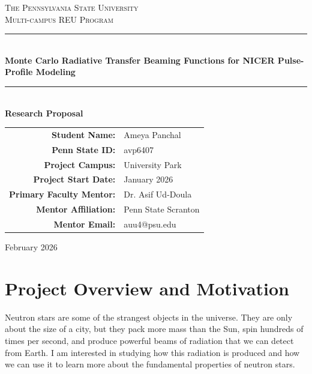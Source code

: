 \documentclass[11pt]{article}
\begin{document}
\begin{titlepage}
    \centering
    \vspace*{2cm}
    
    {\Large\textsc{The Pennsylvania State University}}\\[0.3cm]
    {\large\textsc{Multi-campus REU Program}}\\[2cm]
    
    \rule{\textwidth}{1.5pt}\\[0.5cm]
    {\LARGE\bfseries Monte Carlo Radiative Transfer Beaming Functions for NICER Pulse-Profile Modeling}\\[0.5cm]
    \rule{\textwidth}{1.5pt}\\[2cm]
    
    {\Large\textbf{Research Proposal}}\\[3cm]
    
    \begin{tabular}{rl}
        \textbf{Student Name:} & Ameya Panchal \\[0.5em]
        \textbf{Penn State ID:} & avp6407 \\[0.5em]
        \textbf{Project Campus:} & University Park \\[0.5em]
        \textbf{Project Start Date:} & January 2026 \\[0.5em]
        \textbf{Primary Faculty Mentor:} & Dr. Asif Ud-Doula \\[0.5em]
        \textbf{Mentor Affiliation:} & Penn State Scranton \\[0.5em]
        \textbf{Mentor Email:} & auu4@psu.edu \\
    \end{tabular}
    
    \vfill
    
    {\large February 2026}
    
\end{titlepage}


\section*{Project Overview and Motivation}
Neutron stars are some of the strangest objects in the universe. They are only about the size of a city, but they pack more mass than the Sun, spin hundreds of times per second, and produce powerful beams of radiation that we can detect from Earth. I am interested in studying how this radiation is produced and how we can use it to learn more about the fundamental properties of neutron stars.
\end{document}
